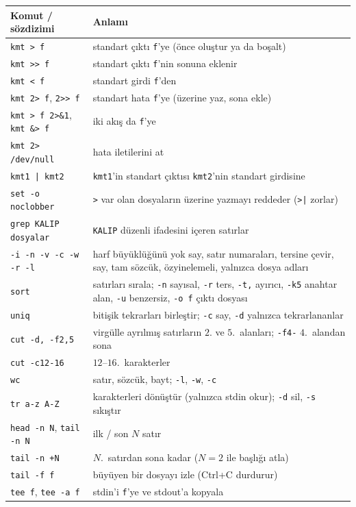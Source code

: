 \documentclass[11pt,a4paper]{article}
\newcommand{\cmd}[1]{\texttt{#1}}
\begin{document}
{\footnotesize
\renewcommand{\arraystretch}{1.2}
\begin{longtable}{@{}p{4.6cm}p{10.9cm}@{}}
\toprule
\textbf{Komut / sözdizimi} & \textbf{Anlamı}\\
\midrule
\endhead
\cmd{kmt > f} & standart çıktı \texttt{f}'ye (önce oluştur ya da boşalt)\\
\cmd{kmt >> f} & standart çıktı \texttt{f}'nin sonuna eklenir\\
\cmd{kmt < f} & standart girdi \texttt{f}'den\\
\cmd{kmt 2> f}, \cmd{2>> f} & standart hata \texttt{f}'ye (üzerine yaz, sona ekle)\\
\cmd{kmt > f 2>\&1}, \cmd{kmt \&> f} & iki akış da \texttt{f}'ye\\
\cmd{kmt 2> /dev/null} & hata iletilerini at\\
\cmd{kmt1 | kmt2} & \texttt{kmt1}'in standart çıktısı \texttt{kmt2}'nin standart girdisine\\
\cmd{set -o noclobber} & \cmd{>} var olan dosyaların üzerine yazmayı reddeder (\cmd{>|} zorlar)\\
\midrule
\cmd{grep KALIP dosyalar} & \texttt{KALIP} düzenli ifadesini içeren satırlar\\
\quad \cmd{-i -n -v -c -w -r -l} & harf büyüklüğünü yok say, satır numaraları, tersine çevir, say, tam sözcük, özyinelemeli, yalnızca dosya adları\\
\cmd{sort} & satırları sırala; \cmd{-n} sayısal, \cmd{-r} ters, \cmd{-t,} ayırıcı, \cmd{-k5} anahtar alan, \cmd{-u} benzersiz, \cmd{-o f} çıktı dosyası\\
\cmd{uniq} & bitişik tekrarları birleştir; \cmd{-c} say, \cmd{-d} yalnızca tekrarlananlar\\
\cmd{cut -d, -f2,5} & virgülle ayrılmış satırların $2$. ve $5$.~alanları; \cmd{-f4-} $4$.~alandan sona\\
\cmd{cut -c12-16} & $12$--$16$.~karakterler\\
\cmd{wc} & satır, sözcük, bayt; \cmd{-l}, \cmd{-w}, \cmd{-c}\\
\cmd{tr a-z A-Z} & karakterleri dönüştür (yalnızca stdin okur); \cmd{-d} sil, \cmd{-s} sıkıştır\\
\cmd{head -n N}, \cmd{tail -n N} & ilk / son $N$ satır\\
\cmd{tail -n +N} & $N$.~satırdan sona kadar ($N = 2$ ile başlığı atla)\\
\cmd{tail -f f} & büyüyen bir dosyayı izle (Ctrl+C durdurur)\\
\cmd{tee f}, \cmd{tee -a f} & stdin'i \texttt{f}'ye ve stdout'a kopyala\\

\end{longtable}}
\end{document}
